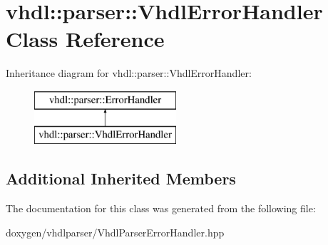 \hypertarget{classvhdl_1_1parser_1_1_vhdl_error_handler}{}\section{vhdl\+::parser\+::Vhdl\+Error\+Handler Class Reference}
\label{classvhdl_1_1parser_1_1_vhdl_error_handler}
Inheritance diagram for vhdl\+::parser\+::Vhdl\+Error\+Handler\+:\begin{figure}[H]
\begin{center}
\leavevmode
\includegraphics[height=2.000000cm]{classvhdl_1_1parser_1_1_vhdl_error_handler}
\end{center}
\end{figure}
\subsection*{Additional Inherited Members}


The documentation for this class was generated from the following file\+:\begin{DoxyCompactItemize}
\item 
doxygen/vhdlparser/Vhdl\+Parser\+Error\+Handler.\+hpp\end{DoxyCompactItemize}
